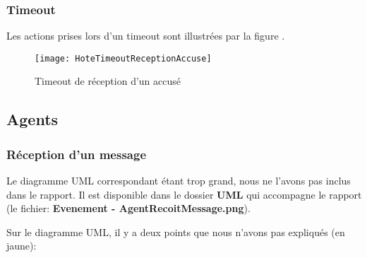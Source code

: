 \documentclass[a4paper,11pt]{article}
\begin{document}
\subsubsection{Timeout}
Les actions prises lors d'un timeout sont illustrées par la figure .

\begin{figure}[h!t]
  \centering
    \texttt{[image: HoteTimeoutReceptionAccuse]}
  \caption{Timeout de réception d'un accusé}
  \label{fig:hote-timeout}
\end{figure}











\subsection{Agents}


\subsubsection{Réception d'un message}\label{evt-agent-reception-message}
Le diagramme UML correspondant étant trop grand, nous ne l'avons pas inclus dans le rapport. Il est disponible dans le dossier \textbf{UML} qui accompagne le rapport (le fichier: \textbf{Evenement - AgentRecoitMessage.png}).

Sur le diagramme UML, il y a deux points que nous n'avons pas expliqués (en jaune):
\end{document}
